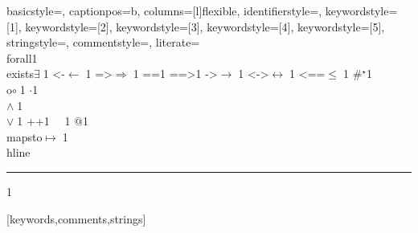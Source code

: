 {basicstyle=\small,
captionpos=b,
columns=[l]flexible,
identifierstyle={\ttfamily\color{black}},
keywordstyle=[1]{\ttfamily\color{dkviolet}},
keywordstyle=[2]{\ttfamily\color{dkgreen}},
keywordstyle=[3]{\ttfamily\color{ltblue}},
keywordstyle=[4]{\ttfamily\color{dkblue}},
keywordstyle=[5]{\ttfamily\color{dkred}},
stringstyle=\ttfamily,
commentstyle={\ttfamily\color{dkgreen}},
literate=
  {\\forall}{{\color{dkgreen}{$\forall\;$}}}1
{\\exists}{{$\exists\;$}}1
{<-}{{$\leftarrow\;$}}1
{=>}{{$\Rightarrow\;$}}1
{==}{{\code{==}\;}}1
{==>}{{\code{==>}\;}}1
{->}{{$\rightarrow\;$}}1
{<->}{{$\leftrightarrow\;$}}1
{<==}{{$\leq\;$}}1
{\#}{{$^\star$}}1
{\\o}{{$\circ\;$}}1
{\@}{{$\cdot$}}1
{\/\\}{{$\wedge\;$}}1
{\\\/}{{$\vee\;$}}1
{++}{{\code{++}}}1
{~}{{\ }}1
{\@\@}{{$@$}}1
{\\mapsto}{{$\mapsto\;$}}1
{\\hline}{{\rule{\linewidth}{0.5pt}}}1
%
}[keywords,comments,strings]


